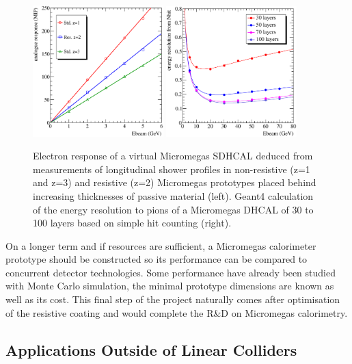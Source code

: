 \begin{figure}[hbp]
\begin{centering}
\includegraphics[width=0.45\textwidth]{Calorimeter/SDHCAL/splam_linearity}
\includegraphics[width=0.45\textwidth]{Calorimeter/SDHCAL/g4reso_sdhcal}
\caption{Electron response of a virtual Micromegas SDHCAL deduced from measurements of longitudinal shower profiles in non-resistive (z=1 and z=3) and resistive (z=2) Micromegas prototypes placed behind increasing thicknesses of passive material (left). Geant4 calculation of the energy resolution to pions of a Micromegas DHCAL of 30 to 100 layers based on simple hit counting (right).}
\label{future}
\end{centering}
\end{figure}


On a longer term and if resources are sufficient, a Micromegas calorimeter prototype should be constructed so its performance can be compared to concurrent detector technologies. Some performance have already been studied with Monte Carlo simulation, the minimal prototype dimensions are known as well as its cost. This final step of the project naturally comes after optimisation of the resistive coating and would complete the R\&D on Micromegas calorimetry.


\subsection{Applications Outside of Linear Colliders}
